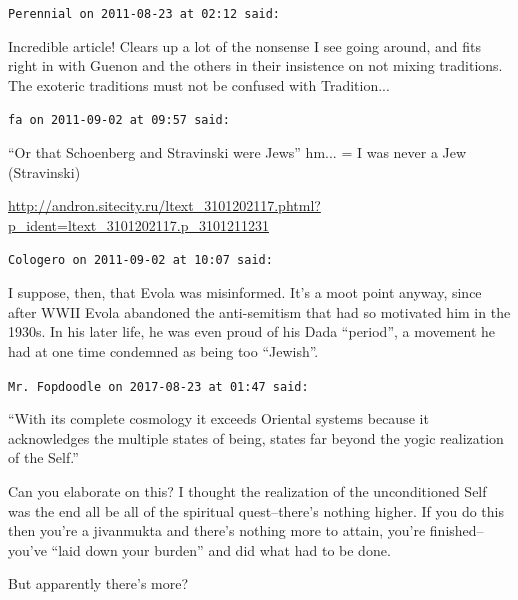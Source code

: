 \begin{footnotesize}
\begin{sffamily}
\texttt{Perennial on 2011-08-23 at 02:12 said:}

Incredible article! Clears up a lot of the nonsense I see going around, and fits right in with Guenon and the others in their insistence on not mixing traditions. The exoteric traditions must not be confused with Tradition... 

\hfill

\texttt{fa on 2011-09-02 at 09:57 said:}

``Or that Schoenberg and Stravinski were Jews'' hm... = I was never a Jew (Stravinski)

\url{http://andron.sitecity.ru/ltext\_3101202117.phtml?p\_ident=ltext\_3101202117.p\_3101211231}


\hfill

\texttt{Cologero on 2011-09-02 at 10:07 said:}

I suppose, then, that Evola was misinformed. It's a moot point anyway, since after WWII Evola abandoned the anti-semitism that had so motivated him in the 1930s. In his later life, he was even proud of his Dada ``period'', a movement he had at one time condemned as being too ``Jewish''.

\hfill

\texttt{Mr. Fopdoodle on 2017-08-23 at 01:47 said:}

``With its complete cosmology it exceeds Oriental systems because it acknowledges the multiple states of being, states far beyond the yogic realization of the Self.''

Can you elaborate on this? I thought the realization of the unconditioned Self was the end all be all of the spiritual quest--there's nothing higher. If you do this then you're a jivanmukta and there's nothing more to attain, you're finished--you've ``laid down your burden'' and did what had to be done.

But apparently there's more?


\hfill

\end{sffamily}
\end{footnotesize}

